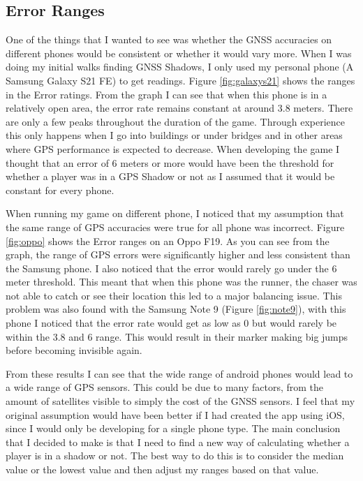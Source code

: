 \documentclass{l4proj}
\begin{document}
\subsection{Error Ranges}
\label{phase1errorrange}
One of the things that I wanted to see was whether the GNSS accuracies on different phones would be consistent or whether it would vary more.
When I was doing my initial walks finding GNSS Shadows, I only used my personal phone (A Samsung Galaxy S21 FE) to get readings. Figure \ref{fig:galaxys21}
shows the ranges in the Error ratings. From the graph I can see that when this phone is in a relatively open area, the error rate remains constant at around 3.8 meters. There
are only a few peaks throughout the duration of the game. Through experience this only happens when I go into buildings or under bridges and in other areas where GPS performance
is expected to decrease. When developing the game I thought that an error of 6 meters or more would have been the threshold for whether a player was in a GPS Shadow or not as I
assumed that it would be constant for every phone.

When running my game on different phone, I noticed that my assumption that the same range of GPS accuracies were true for all phone was incorrect. Figure \ref{fig:oppo}
shows the Error ranges on an Oppo F19. As you can see from the graph, the range of GPS errors were significantly higher and less consistent than the Samsung phone. I also
noticed that the error would rarely go under the 6 meter threshold. This meant that when this phone was the runner, the chaser was not able to catch or see their location
this led to a major balancing issue. This problem was also found with the Samsung Note 9 (Figure \ref{fig:note9}), with this phone I noticed that the error rate would get
as low as 0 but would rarely be within the 3.8 and 6 range. This would result in their marker making big jumps before becoming invisible again.

From these results I can see that the wide range of android phones would lead to a wide range of GPS sensors. This could be due to many factors, from the amount of satellites
visible to simply the cost of the GNSS sensors. I feel that my original assumption would have been better if I had created the app using iOS, since I would only be developing
for a single phone type. The main conclusion that I decided to make is that I need to find a new way of calculating whether a player is in a shadow or not.
The best way to do this is to consider the median value or the lowest value and then adjust my ranges based on that value.  
\end{document}
